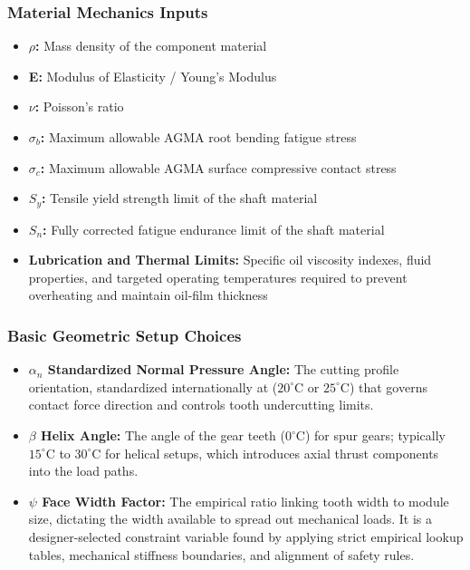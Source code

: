 		\subsubsection{Material Mechanics Inputs}
			\begin{itemize}
				\item \textbf{$\rho$:} Mass density of the component material
				\item \textbf{E:} Modulus of Elasticity / Young's Modulus
				\item \textbf{$\nu$:} Poisson's ratio
				\item \textbf{$\sigma_b$:} Maximum allowable AGMA root bending fatigue stress
				\item \textbf{$\sigma_c$:} Maximum allowable AGMA surface compressive contact stress
				\item \textbf{$S_{y}$:} Tensile yield strength limit of the shaft material
				\item \textbf{$S_{n}$:} Fully corrected fatigue endurance limit of the shaft material
				\item \textbf{Lubrication and Thermal Limits:} Specific oil viscosity indexes, fluid properties, 
				and targeted operating temperatures required to prevent overheating and maintain oil-film thickness 
			\end{itemize}

		\subsubsection{Basic Geometric Setup Choices}
			\begin{itemize}
				\item \textbf{$\alpha_n$ Standardized Normal Pressure Angle:} The cutting profile orientation, 
				standardized internationally at ($20^\circ\text{C}$ or $25^\circ\text{C}$) that governs 
				contact force direction and controls tooth undercutting limits.
				\item \textbf{$\beta$ Helix Angle:} The angle of the gear teeth ($0^\circ\text{C}$) for spur gears; 
				typically $15^\circ\text{C}$ to $30^\circ\text{C}$ for helical setups, which introduces 
				axial thrust components into the load paths.
				\item \textbf{$\psi$ Face Width Factor:} The empirical ratio linking tooth width to module size, 
				dictating the width available to spread out mechanical loads. It is a designer-selected constraint 
				variable found by applying strict empirical lookup tables, mechanical stiffness boundaries, and 
				alignment of safety rules.
			\end{itemize}

